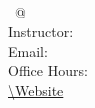 \documentclass[12pt,twoside]{article}
\begin{document}
%

\begin{flushleft}
\textbf{\CourseTitle{}} \\
\DateTime \ @ \Room \\
Instructor: \InstructorName \\
Email: \Email \\
Office Hours: \OfficeHours \\
\url{\Website} \\
\end{flushleft}






\nocite{*}


\vfill
\footnotesize

\end{document}
